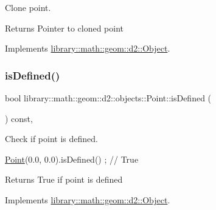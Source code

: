 Clone point. 

\begin{DoxyReturn}{Returns}
Pointer to cloned point 
\end{DoxyReturn}


Implements \hyperlink{classlibrary_1_1math_1_1geom_1_1d2_1_1_object_a5c26ae4120edb24f6463d65a9cef247d}{library\+::math\+::geom\+::d2\+::\+Object}.

\mbox{\label{classlibrary_1_1math_1_1geom_1_1d2_1_1objects_1_1_point_ac90251968d8eb11df82e28f6cf095e5c}} 
\subsubsection{\texorpdfstring{is\+Defined()}{isDefined()}}
{\footnotesize\ttfamily bool library\+::math\+::geom\+::d2\+::objects\+::\+Point\+::is\+Defined (\begin{DoxyParamCaption}{ }\end{DoxyParamCaption}) const\hspace{0.3cm}{\ttfamily [override]}, {\ttfamily [virtual]}}



Check if point is defined. 


\begin{DoxyCode}
\hyperlink{classlibrary_1_1math_1_1geom_1_1d2_1_1objects_1_1_point_a4998aefdf80bdfd967f21d49fa050398}{Point}(0.0, 0.0).isDefined() ; \textcolor{comment}{// True}
\end{DoxyCode}


\begin{DoxyReturn}{Returns}
True if point is defined 
\end{DoxyReturn}


Implements \hyperlink{classlibrary_1_1math_1_1geom_1_1d2_1_1_object_ae9506254971168a3ca63e1923556b70d}{library\+::math\+::geom\+::d2\+::\+Object}.

\mbox{\label{classlibrary_1_1math_1_1geom_1_1d2_1_1objects_1_1_point_aeec1bab241792dc6b6091d9cac36d02e}} 
